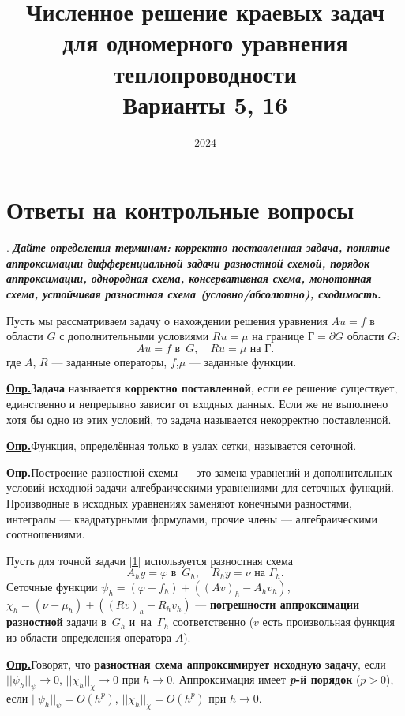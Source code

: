\documentclass[12pt, a4paper]{article}
\title{Численное решение краевых задач для одномерного уравнения теплопроводности \\ Варианты 5, 16}
\date{2024}
\newcommand{\opr}{\textbf{\underline{{Опр.}}}\quad}
\renewcommand{\phi}{\varphi}
\newcounter{mycounter}
\newcommand{\quastion}[1]{%
	\stepcounter{mycounter}%
	\textbf{\themycounter}.  %
	\textbf{\textit{#1}}
	
}
\newcommand{\rusg}{\text{Г}}
\begin{document}
	\maketitle
	\section{Ответы на контрольные вопросы}
	
	\quastion{Дайте определения терминам: корректно поставленная задача, понятие аппроксимации дифференциальной задачи разностной схемой, порядок аппроксимации, однородная схема, консервативная схема, монотонная схема, устойчивая разностная схема (условно/абсолютно), сходимость.}
	
	Пусть мы рассматриваем задачу о нахождении решения уравнения $Au = f$ в области $G$ с дополнительными условиями $Ru = \mu$ на границе $\rusg = \partial G$ области $G$:
	\begin{equation}
		Au = f   \text{ в } \, G, \quad Ru = \mu \text{ на } \rusg.
		\label{1}
	\end{equation}
	где $A$, $R$ --- заданные операторы, $f$,$\mu$ --- заданные функции.
	
	\opr \textbf{Задача} называется \textbf{корректно поставленной}, если ее решение существует, единственно и непрерывно зависит от входных данных. Если же не выполнено хотя бы одно из этих условий, то задача называется некорректно поставленной.
	
	\opr Функция, определённая только в узлах сетки, называется сеточной.
	
	\opr Построение разностной схемы --- это замена уравнений и дополнительных условий исходной задачи алгебраическими уравнениями для сеточных функций. Производные в исходных уравнениях заменяют конечными разностями, интегралы --- квадратурными формулами, прочие члены --- алгебраическими соотношениями.
	
	Пусть для точной задачи \eqref{1} используется разностная схема
	\begin{equation}
		A_h y = \phi   \text{ в } \, G_h, \quad R_h y = \nu \text{ на } \Gamma_h.
		\label{2}
	\end{equation}
	Сеточные функции $\psi_h = (\phi - f_h) + ((A v)_h - A_h v_h)$, \quad $\chi_h = (\nu - \mu_h) + ((R v)_h - R_h v_h)$ --- \textbf{погрешности аппроксимации разностной} задачи в~$G_h$ и~на~$\Gamma_h$ соответственно ($v$ есть произвольная функция из области определения оператора $A$).
	
	\opr Говорят, что \textbf{разностная схема аппроксимирует исходную задачу}, если $ ||\psi_h||_\psi \to 0$, $ ||\chi_h||_\chi \to 0$ при $h \to 0$. Аппроксимация имеет \textbf{\textit{p}-й порядок} ($p > 0$), если $ ||\psi_h||_\psi = O(h^p)$, $ ||\chi_h||_\chi = O(h^p)$  при $h \to 0$.
	
\end{document}
